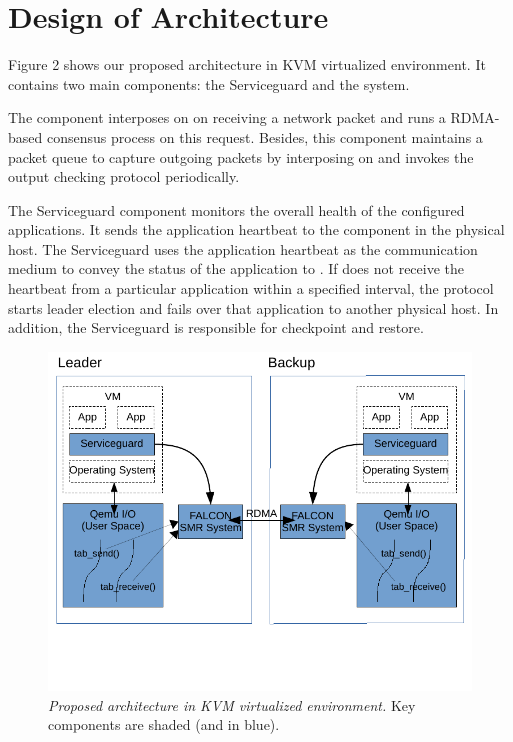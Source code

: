 \section{Design of Architecture} \label{sec:overview}

Figure 2 shows our proposed architecture in KVM virtualized environment. 
It contains two main components: the Serviceguard and the \smrsystem \smr system.

The \smrsystem component interposes on \tapsend on receiving a network packet 
and runs a RDMA-based consensus process on this request. Besides, this component 
maintains a packet queue to capture outgoing packets by interposing on 
\taprecv and invokes the output checking protocol periodically. 

The Serviceguard component monitors the overall health of the configured applications. 
It sends the application heartbeat to the \smrsystem component in the physical 
host. The Serviceguard uses the application heartbeat as the communication 
medium to convey the status of the application to \smrsystem. If \smrsystem does not 
receive the heartbeat from a particular application within a specified interval, 
the protocol starts leader election and fails over that application to another physical 
host. In addition, the Serviceguard is responsible for checkpoint and restore. 

\begin{figure}[t]
\centering
\includegraphics[width=.47\textwidth]{figures/arch}
\vspace{-.2in}
\caption{{\em Proposed architecture in KVM virtualized environment.} Key components are shaded (and
in blue).} \label{fig:arc}
\vspace{.05in}
\end{figure}
